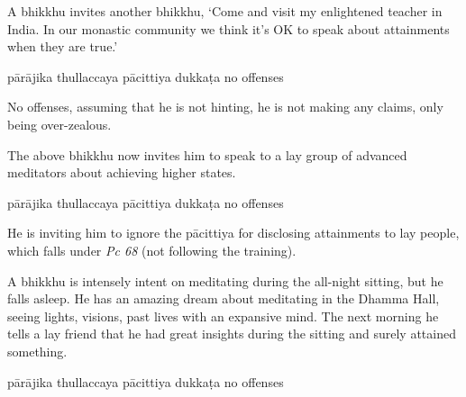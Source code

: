 \begin{exam}{\autoExamName}
\begin{problem*}
\begin{parts}
  \bigskip

  \item A bhikkhu invites another bhikkhu, `Come and visit my enlightened teacher in India. In our monastic community we think it's OK to speak about attainments when they are true.'

  \bigskip

  \begin{answers}{5}
    \bChoices
     pārājika\eAns
     thullaccaya\eAns
     pācittiya\eAns
     dukkaṭa\eAns
     no offenses\eAns
    \eChoices
  \end{answers}

  \begin{solution}
    No offenses, assuming that he is not hinting, he is not making any claims, only being over-zealous.
  \end{solution}

  \bigskip

  \item The above bhikkhu now invites him to speak to a lay group of advanced meditators about achieving higher states.

  \bigskip

  \begin{answers}{5}
    \bChoices
     pārājika\eAns
     thullaccaya\eAns
     pācittiya\eAns
     dukkaṭa\eAns
     no offenses\eAns
    \eChoices
  \end{answers}

  \begin{solution}
    He is inviting him to ignore the pācittiya for disclosing attainments to lay people, which falls under \emph{Pc 68} (not following the training).
  \end{solution}

  \ifnosolutions
  \bigskip
  \else
  \clearpage
  \fi

  \item A bhikkhu is intensely intent on meditating during the all-night sitting, but he falls asleep. He has an amazing dream about meditating in the Dhamma Hall, seeing lights, visions, past lives with an expansive mind. The next morning he tells a lay friend that he had great insights during the sitting and surely attained something.

  \bigskip

  \begin{answers}{5}
    \bChoices
     pārājika\eAns
     thullaccaya\eAns
     pācittiya\eAns
     dukkaṭa\eAns
     no offenses\eAns
    \eChoices
  \end{answers}


\end{parts}
\end{problem*}
\end{exam}
